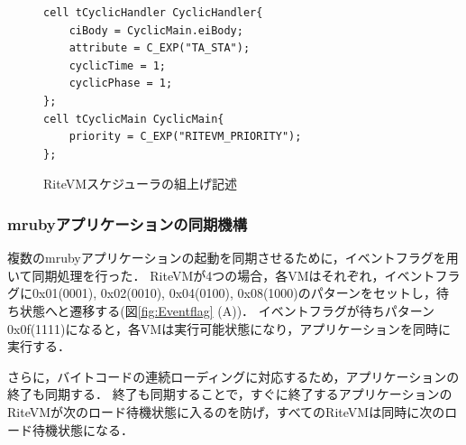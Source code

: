 \documentclass[submit,techrep]{ipsj}
\begin{document}
\begin{figure}[t]
    \centering
    \begin{lstlisting}
cell tCyclicHandler CyclicHandler{
    ciBody = CyclicMain.eiBody;
    attribute = C_EXP("TA_STA");
    cyclicTime = 1;
    cyclicPhase = 1;
};
cell tCyclicMain CyclicMain{
    priority = C_EXP("RITEVM_PRIORITY");
};
   \end{lstlisting}
    \vspace{-2mm}
    \caption{RiteVMスケジューラの組上げ記述}
\vspace{-3mm}
    \label{build_cyclic_handler}
\end{figure}
 
\subsubsection{mrubyアプリケーションの同期機構}
複数のmrubyアプリケーションの起動を同期させるために，イベントフラグを用いて同期処理を行った．
RiteVMが4つの場合，各VMはそれぞれ，イベントフラグに0x01(0001), 0x02(0010), 0x04(0100), 0x08(1000)のパターンをセットし，待ち状態へと遷移する(図\ref{fig:Eventflag} (A))．
イベントフラグが待ちパターン0x0f(1111)になると，各VMは実行可能状態になり，アプリケーションを同時に実行する．

さらに，バイトコードの連続ローディングに対応するため，アプリケーションの終了も同期する．
終了も同期することで，すぐに終了するアプリケーションのRiteVMが次のロード待機状態に入るのを防げ，すべてのRiteVMは同時に次のロード待機状態になる．
\end{document}
